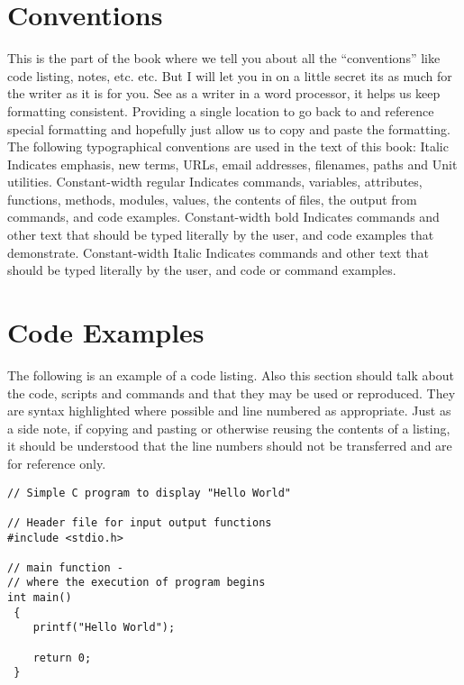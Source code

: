 \section{Conventions}

This is the part of the book where we tell you about all the “conventions” like code listing, notes, etc. etc. But I will let you in on a little secret its as much for the writer as it is for you. See as a writer in a word processor, it helps us keep formatting consistent. Providing a single location to go back to and reference special formatting and hopefully just allow us to copy and paste the formatting. 
The following typographical conventions are used in the text of this book:
Italic
Indicates emphasis, new terms, URLs, email addresses, filenames, paths and Unit utilities.
Constant-width regular
Indicates commands, variables, attributes, functions, methods, modules, values, the contents of files, the output from commands, and code examples.
Constant-width bold
Indicates commands and other text that should be typed literally by the user, and code examples that demonstrate.
Constant-width Italic
Indicates commands and other text that should be typed literally by the user, and code or command examples.

\section{Code Examples}

The following is an example of a code listing. Also this section should talk about the code, scripts and commands and that they may be used or reproduced. They are syntax highlighted where possible and line numbered as appropriate. Just as a side note, if copying and pasting or otherwise reusing the contents of a listing, it should be understood that the line numbers should not be transferred and are for reference only.
\begin{verbatim}
// Simple C program to display "Hello World"
 
// Header file for input output functions
#include <stdio.h>
  
// main function -
// where the execution of program begins
int main()
 {
	printf("Hello World");

  	return 0;
 }
\end{verbatim}

